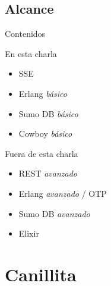 \documentclass[utf8,hyperref={colorlinks=true}]{beamer}
\begin{document}
\subsection{Alcance}
\begin{frame}{Contenidos}
\begin{multicols}{2}
	\alert{En esta charla}
		\begin{itemize} \itemsep1em
			\item<+-> SSE
			\item<+-> Erlang \emph{b\'asico}
			\item<+-> Sumo DB \emph{b\'asico}
			\item<+-> Cowboy \emph{b\'asico}
		\end{itemize}
\columnbreak
	\alert{Fuera de esta charla}
		\begin{itemize} \itemsep1em
			\item<+-> REST \emph{avanzado}
			\item<+-> Erlang \emph{avanzado} / OTP
			\item<+-> Sumo DB \emph{avanzado}
			\item<+-> Elixir
		\end{itemize}
\end{multicols}
\end{frame}

\section{Canillita}
\end{document}
